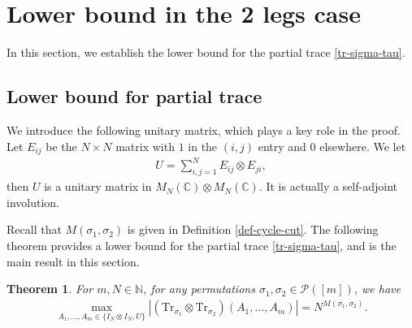 \documentclass[10pt,a4paper]{amsart}
\numberwithin{equation}{section}
\theoremstyle{plain}
\newtheorem{theorem}{Theorem}[section]
\def\bN{\mathbb N}
\def\bC{\mathbb C}
\def\cP{\mathcal P}
\def\Tr{\mathrm {Tr}}
\begin{document}
\section{Lower bound in the 2 legs case} \label{sec:lower}

In this section, we establish the lower bound for the partial trace \eqref{tr-sigma-tau}.

\subsection{Lower bound for partial trace}

We introduce the following unitary matrix, which plays a key role in the proof.
Let $E_{ij}$ be the $N \times N$ matrix with $1$ in the $(i,j)$ entry and $0$ elsewhere. We let
\begin{align*}
    U = \sum_{i,j=1}^N E_{ij} \otimes E_{ji},
\end{align*}
then $U$ is a unitary matrix in $M_N(\bC) \otimes M_N(\bC)$.
It is actually a self-adjoint involution.

Recall that $M(\sigma_1,\sigma_2)$ is given in Definition \ref{def-cycle-cut}. The following theorem provides a lower bound for the partial trace \eqref{tr-sigma-tau}, and is the main result in this section.

\begin{theorem} \label{Thm-lower}
For $m,N \in \bN$, for any permutations $\sigma_1,\sigma_2 \in \cP([m])$, we have
\begin{align*}
    \max_{A_1,\ldots,A_m \in \{I_N \otimes I_N, U\}} \left| \left( \Tr_{\sigma_1} \otimes \Tr_{\sigma_2} \right) \left( A_1, \ldots, A_m \right) \right|
    = N^{M(\sigma_1,\sigma_2)}.
\end{align*}
\end{theorem}
\end{document}
